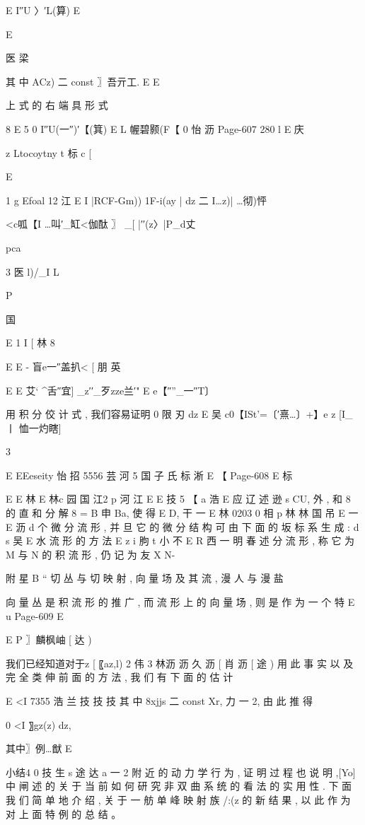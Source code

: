 {E I″U 〉′L(算) E

E

医 梁

其 中 ACz) 二 const 〗吾亓工. E
E

上 式 的 右 端 具 形 式

8
E 5 0
I″U(一″)′【(箕) E L 幄碧颢(F【 0 怡 沥
Page-607
280 l
E 庆

z
Ltocoytny t 标 c
[

E

1
g Efoal 12 江 E
I |RCF-Gm)) 1F-i(ay | dz 二 I…z)| …彻)怦

<c呱【I …叫′_缸<伽酞 〗 _[ |′′(z〉|P_d丈

pca

3 医 l)/_I L

P

国

E
1 I [
林 8

E
E
- 盲e一″盖扒< [ 朋 英

E
E 艾` ^舌″宜] _z′′_歹zze兰′" E e【″”_一″T〕

用 积 分 佼 计 式 , 我们容易证明
0 限 刃 dz
E 吴
c0【ISt'=〔′熹…〕+】e z [I_丨 恤一灼瞎]

3

E
EEeseity 怡 招 5556 芸 河 5 国 子 氏 标 淅
E 【
Page-608
E 标

E
E 林
E 林c 园
国 江2 p
河 江
E
E 技 5
【 a 浩
E 应 辽 述 逊 s
CU, 外 , 和 8 的 直 和 分 解 8 = B 申 Ba, 使 得 E D, 干 一
E 林 0203 0 相
p 林 林 国 吊
E 一
E 沥 d
个 微 分 流 形 , 并 旦 它 的 微 分 结 构 可 由 下 面 的 坂 标 系 生 成 :
d
s 吴
E 水
流 形 的 方 法
E z i 朐
t 小 不
E R 西 一 明 春 述
分 流 形 , 称 它 为 M 与 N 的 积 流 形 , 仍 记 为 友 X N-

附 星 B “ 切 丛 与 切 映 射 , 向 量 场 及 其 流 , 漫 人 与 漫 盐

向 量 丛 是 积 流 形 的 推 广 , 而 流 形 上 的 向 量 场 , 则 是 作 为 一 个 特
E u
Page-609
E

E
P 〗麟枫岫 [ 达 )

我们已经知道对于z [ 〖az,l) 2 伟 3 林沥 沥 久
沥
[ 肖 沥 [ 途 )
用 此 事 实 以 及 完 全 类 伸 前 面 的 方 法 , 我 们 有 下 面 的 估 计

E <I 7355 浩 兰 技 技 技
其 中 8xjjs 二 const Xr, 力 一 2, 由 此 推 得

0 <I 〗gz(z) dz,

其中〗例…猷 E

小结4 0 技 生 s 途 达
a 一 2 附 近 的 动 力 学 行 为 , 证 明 过 程 也 说 明 ,[Yo] 中 闸 述 的 关 于 当
前 如 何 研 究 非 双 曲 系 统 的 看 法 的 实 用 性 . 下 面 我 们 简 单 地 介 绍 , 关
于 一 舫 单 峰 映 射 族 /:(z 的 新 结 果 , 以 此 作 为 对 上 面 特 例 的 总 结 。

}
